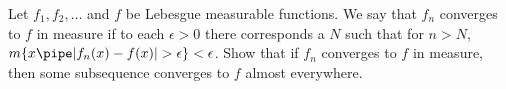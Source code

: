 Let $f_1,f_2,\ldots $ and $f$ be Lebesgue measurable functions. We say
that $f_n$ converges to $f$ in measure if to each $\epsilon>0$ there
corresponds a $N$ such that for $n>N$, $m\{x\pipe
|f_n(x)-f(x)|>\epsilon\}<\epsilon$. Show that if $f_n$ converges to
$f$ in measure, then some subsequence converges to $f$ almost everywhere.
